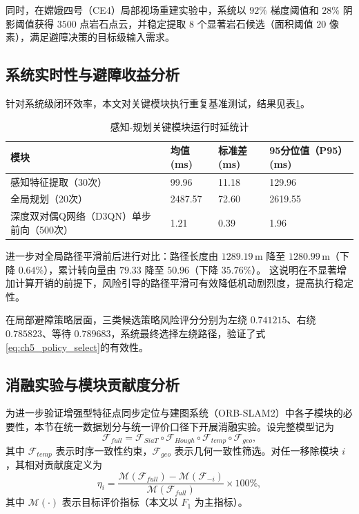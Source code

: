 \documentclass[UTF8,zihao=-4,a4paper,oneside,openany]{ctexrep}
\numberwithin{equation}{chapter}
\renewcommand{\small}{\normalsize}
\renewcommand{\small}{\normalsize}
\theoremstyle{plain}
\theoremstyle{definition}
\begin{document}
同时，在嫦娥四号（CE4）局部视场重建实验中，系统以 $92\%$ 梯度阈值和 $28\%$ 阴影阈值获得 $3500$ 点岩石点云，并稳定提取 $8$ 个显著岩石候选（面积阈值 $20$ 像素），满足避障决策的目标级输入需求。

\subsection{系统实时性与避障收益分析}
\label{subsec:ch5_realtime_benefit}

针对系统级闭环效率，本文对关键模块执行重复基准测试，结果见表\ref{tab:ch5_runtime_benchmark}。

\begin{table}[H]
	\centering
	\small
	\caption{感知-规划关键模块运行时延统计}
	\label{tab:ch5_runtime_benchmark}
	\begin{tabular}{p{}p{}p{}p{}}
		\toprule
		模块 & 均值(ms) & 标准差(ms) & 95分位值（P95）(ms) \\
		\midrule
		感知特征提取（30次） & 99.96 & 11.18 & 129.96 \\
		全局规划（20次） & 2487.57 & 72.60 & 2619.55 \\
		深度双对偶Q网络（D3QN）单步前向（500次） & 1.21 & 0.39 & 1.96 \\
		\bottomrule
	\end{tabular}
\end{table}

进一步对全局路径平滑前后进行对比：路径长度由 $1289.19\,\mathrm{m}$ 降至 $1280.99\,\mathrm{m}$（下降 $0.64\%$），累计转向量由 $79.33$ 降至 $50.96$（下降 $35.76\%$）。
这说明在不显著增加计算开销的前提下，风险引导的路径平滑可有效降低机动剧烈度，提高执行稳定性。

在局部避障策略层面，三类候选策略风险评分分别为左绕 $0.741215$、右绕 $0.785823$、等待 $0.789683$，系统最终选择左绕路径，验证了式\eqref{eq:ch5_policy_select}的有效性。

\subsection{消融实验与模块贡献度分析}
\label{subsec:ch5_ablation}

为进一步验证增强型特征点同步定位与建图系统（ORB-SLAM2）中各子模块的必要性，本节在统一数据划分与统一评价口径下开展消融实验。设完整模型记为
\begin{equation}
\mathcal{F}_{full}=\mathcal{F}_{SiaT}\circ\mathcal{F}_{Hough}\circ\mathcal{F}_{temp}\circ\mathcal{F}_{geo},
\label{eq:ch5_full_pipeline}
\end{equation}
其中 $\mathcal{F}_{temp}$ 表示时序一致性约束，$\mathcal{F}_{geo}$ 表示几何一致性筛选。对任一移除模块 $i$，其相对贡献度定义为
\begin{equation}
\eta_i=\frac{\mathcal{M}(\mathcal{F}_{full})-\mathcal{M}(\mathcal{F}_{-i})}{\mathcal{M}(\mathcal{F}_{full})}\times 100\%,
\label{eq:ch5_contribution}
\end{equation}
其中 $\mathcal{M}(\cdot)$ 表示目标评价指标（本文以 $F_1$ 为主指标）。
\end{document}
